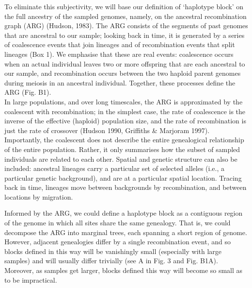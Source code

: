 \documentclass[twocolumn]{bmcart}%
\begin{document}
To eliminate this subjectivity, we will base our definition of ‘haplotype block’ on the full ancestry of the sampled genomes, namely, on the ancestral recombination graph (ARG) (Hudson, 1983). The ARG consists of the segments of past genomes that are ancestral to our sample; looking back in time, it is generated by a series of coalescence events that join lineages and of recombination events that split lineages (Box 1). We emphasise that these are real events: coalescence occurs when an actual individual leaves two or more offspring that are each ancestral to our sample, and recombination occurs between the two haploid parent genomes during meiosis in an ancestral individual. Together, these processes define the ARG (Fig. B1). \\
In large populations, and over long timescales, the ARG is approximated by the coalescent with recombination; in the simplest case, the rate of coalescence is the inverse of the effective (haploid) population size, and the rate of recombination is just the rate of crossover (Hudson 1990, Griffiths \& Marjoram 1997). Importantly, the coalescent does not describe the entire genealogical relationship of the entire population. Rather, it only summarises how the subset of sampled individuals are related to each other. Spatial and genetic structure can also be included: ancestral lineages carry a particular set of selected alleles (i.e., a particular genetic background), and are at a particular spatial location. Tracing back in time, lineages move between backgrounds by recombination, and between locations by migration.

Informed by the ARG, we could define a haplotype block as a contiguous region of the genome in which all sites share the same genealogy. That is, we could decompose the ARG into marginal trees, each spanning a short region of genome. However, adjacent genealogies differ by a single recombination event, and so blocks defined in this way will be vanishingly small (especially with large samples) and will usually differ trivially (see A in Fig. 3 and Fig. B1A). Moreover, as samples get larger, blocks defined this way will become so small as to be impractical.
\end{document}
